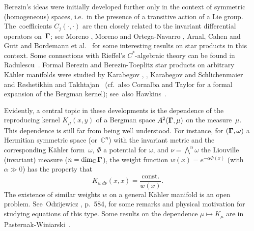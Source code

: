 \documentclass[12pt]{amsart}
\numberwithin{equation}{section}
\theoremstyle{remark}
\newcommand\Omg{{\bigam}}   %
\newcommand{\CC}{\C}
\newcommand{\bigam}{\mbox{\boldmath $\Gamma$}}
\newcommand{\C}{\mathbb C}
\begin{document}
Berezin's ideas were initially developed further only in the context of
symmetric (homogeneous) spaces, i.e.~in the presence of a transitive action of
a Lie group. The~coefficients $C_j(\cdot,\cdot)$ are then closely related to
the invariant differential operators on~$\Omg$; see Moreno \cite{bib:Mor},
Moreno and Ortega-Navarro \cite{bib:MorON}, Arnal, Cahen and Gutt
\cite{bib:Arn} and Bordemann et al.~\cite{bib:BorAL} for some interesting
results on star products
in this context. Some connections with Rieffel's $C^*$-algebraic theory can be
found in Radulescu~\cite{bib:Radul}. Formal Berezin and Berezin-Toeplitz star
products on arbitrary K\"ahler manifolds were studied by Karabegov
\cite{bib:KarA}, \cite{bib:KarCf}, Karabegov and Schlichenmaier
\cite{bib:KaSchli} and Reshetikhin and Takhtajan~\cite{bib:ReTa} (cf.~also
Cornalba and Taylor \cite{bib:CornTay} for a formal expansion of the Bergman
kernel);  see~also Hawkins~\cite{bib:Hawk}.

Evidently, a central topic in these developments is the dependence of the
reproducing kernel $K_\mu(x,y)$ of a Bergman space $A^2(\Omg,\mu)$ on the
measure~$\mu$. This dependence is still far from being well understood. For
instance, for $(\Omg,\omega)$ a Hermitian symmetric space (or~$\CC^n$) with the
invariant metric and the corresponding K\"ahler form~$\omega$, $\Phi$ a
potential for $\omega$, and $\nu=\bigwedge^n\omega$ the Liouville (invariant)
measure ($n=\dim_\CC\Omg$), the weight function $w(x)=e^{-\alpha\Phi(x)}$
(with~$\alpha\gg0$) has the property that
$$ K_{w\,d\nu}(x,x) = \frac{\text{const.}}{w(x)} .  $$
The existence of similar weights $w$ on a general K\"ahler manifold is an open
problem. See~Odzi\-je\-wicz \cite{bib:OdzijA}, p.~584, for some remarks and
physical motivation for studying equations of this type. Some results on the
dependence $\mu\mapsto K_\mu$ are in Pasternak-Winiarski~\cite{bib:PWb}.
\end{document}
